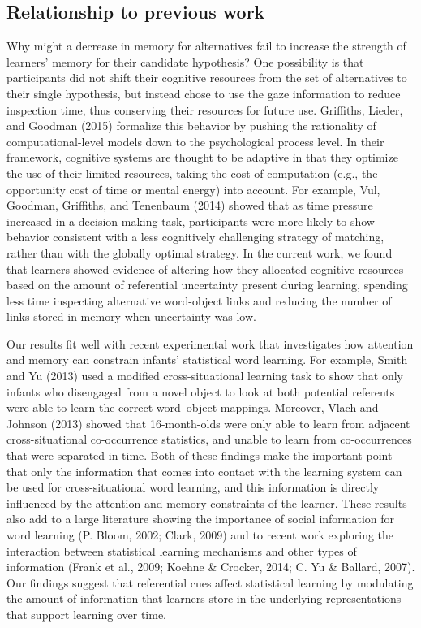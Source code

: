 \documentclass[oneside]{report}
\begin{document}
\subsection{Relationship to previous
work}\label{relationship-to-previous-work}

Why might a decrease in memory for alternatives fail to increase the
strength of learners' memory for their candidate hypothesis? One
possibility is that participants did not shift their cognitive resources
from the set of alternatives to their single hypothesis, but instead
chose to use the gaze information to reduce inspection time, thus
conserving their resources for future use. Griffiths, Lieder, and
Goodman (2015) formalize this behavior by pushing the rationality of
computational-level models down to the psychological process level. In
their framework, cognitive systems are thought to be adaptive in that
they optimize the use of their limited resources, taking the cost of
computation (e.g., the opportunity cost of time or mental energy) into
account. For example, Vul, Goodman, Griffiths, and Tenenbaum (2014)
showed that as time pressure increased in a decision-making task,
participants were more likely to show behavior consistent with a less
cognitively challenging strategy of matching, rather than with the
globally optimal strategy. In the current work, we found that learners
showed evidence of altering how they allocated cognitive resources based
on the amount of referential uncertainty present during learning,
spending less time inspecting alternative word-object links and reducing
the number of links stored in memory when uncertainty was low.

Our results fit well with recent experimental work that investigates how
attention and memory can constrain infants' statistical word learning.
For example, Smith and Yu (2013) used a modified cross-situational
learning task to show that only infants who disengaged from a novel
object to look at both potential referents were able to learn the
correct word--object mappings. Moreover, Vlach and Johnson (2013) showed
that 16-month-olds were only able to learn from adjacent
cross-situational co-occurrence statistics, and unable to learn from
co-occurrences that were separated in time. Both of these findings make
the important point that only the information that comes into contact
with the learning system can be used for cross-situational word
learning, and this information is directly influenced by the attention
and memory constraints of the learner. These results also add to a large
literature showing the importance of social information for word
learning (P. Bloom, 2002; Clark, 2009) and to recent work exploring the
interaction between statistical learning mechanisms and other types of
information (Frank et al., 2009; Koehne \& Crocker, 2014; C. Yu \&
Ballard, 2007). Our findings suggest that referential cues affect
statistical learning by modulating the amount of information that
learners store in the underlying representations that support learning
over time.
\end{document}

